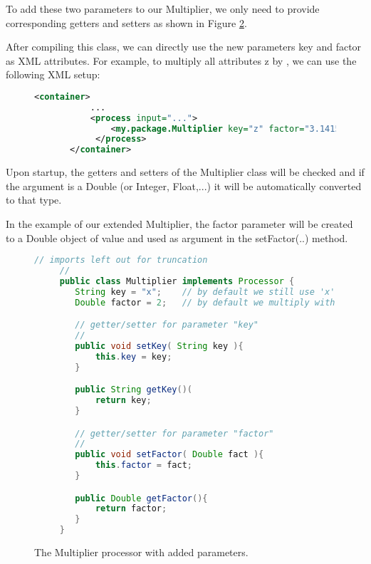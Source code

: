 To add these two parameters to our Multiplier, we only need to provide
corresponding getters and setters as shown in Figure
\ref{fig:multiplyParameters}.
        
After compiling this class, we can directly use the new parameters
{\ttfamily key} and {\ttfamily factor} as XML attributes. For example,
to multiply all attributes {\ttfamily z} by {}, we can
use the following XML setup:

\begin{figure}[h!]
  \centering
  \begin{lstlisting}[language=XML]
       <container>
           ...
           <process input="...">
               <my.package.Multiplier key="z" factor="3.1415" />
            </process>
       </container>
  \end{lstlisting}
  \caption{\label{fig:multiplyParametersXML}}
\end{figure}

Upon startup, the getters and setters of the Multiplier class will be
checked and if the argument is a Double (or Integer, Float,...) it
will be automatically converted to that type.

In the example of our extended Multiplier, the {\ttfamily factor}
parameter will be created to a Double object of value {} and
used as argument in the {\ttfamily setFactor(..)} method.


\begin{figure}[h!]
  \centering \footnotesize{
  \begin{lstlisting}[language=Java]
     // imports left out for truncation
     //
     public class Multiplier implements Processor {
        String key = "x";    // by default we still use 'x'
        Double factor = 2;   // by default we multiply with 2

        // getter/setter for parameter "key"
        //
        public void setKey( String key ){
            this.key = key;
        }

        public String getKey()(
            return key;
        }

        // getter/setter for parameter "factor"
        // 
        public void setFactor( Double fact ){
            this.factor = fact;
        }

        public Double getFactor(){
            return factor;
        }
     }
  \end{lstlisting}}
  \caption{\label{fig:multiplyParameters}The {\ttfamily Multiplier} processor with added parameters.}
\end{figure}

